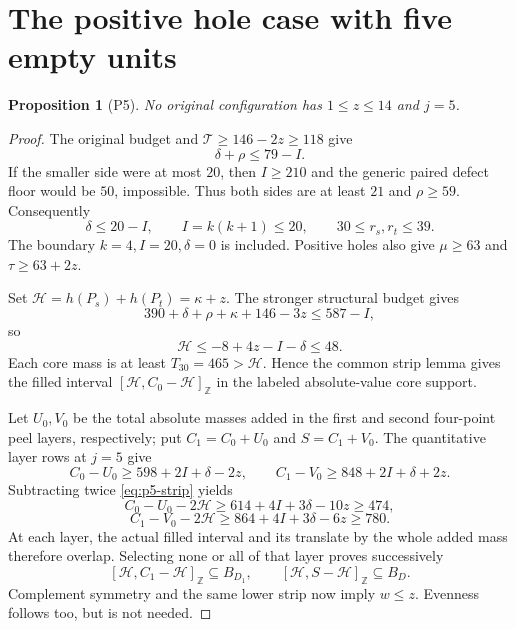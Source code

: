 \documentclass[11pt,letterpaper]{article}
\newcommand{\Z}{\mathbb Z}\newcommand{\R}{\mathbb R}
\newtheorem{proposition}[theorem]{Proposition}
\theoremstyle{definition}\newtheorem{definition}[theorem]{Definition}
\begin{document}
\section{The positive hole case with five empty units}\label{sec:p5}
\begin{proposition}[P5]\label{prop:p5}
No original configuration has $1\le z\le14$ and $j=5$.
\end{proposition}
\begin{proof}
The original budget and $\mathcal T\ge146-2z\ge118$ give
\[
\delta+\rho\le79-I.
\]
If the smaller side were at most $20$, then $I\ge210$ and the generic paired defect floor would be $50$, impossible. Thus both sides are at least $21$ and $\rho\ge59$. Consequently
\begin{equation}\label{eq:p5-domain}
\delta\le20-I,\qquad I=k(k+1)\le20,\qquad30\le r_s,r_t\le39.
\end{equation}
The boundary $k=4,I=20,\delta=0$ is included. Positive holes also give $\mu\ge63$ and $\tau\ge63+2z$.

Set $\mathcal H=h(P_s)+h(P_t)=\kappa+z$. The stronger structural budget gives
\[
390+\delta+\rho+\kappa+146-3z\le587-I,
\]
so
\begin{equation}\label{eq:p5-strip}
\mathcal H\le-8+4z-I-\delta\le48.
\end{equation}
Each core mass is at least $T_{30}=465>\mathcal H$. Hence the common strip lemma gives the filled interval $[\mathcal H,C_0-\mathcal H]_{\Z}$ in the labeled absolute-value core support.

Let $U_0,V_0$ be the total absolute masses added in the first and second four-point peel layers, respectively; put $C_1=C_0+U_0$ and $S=C_1+V_0$. The quantitative layer rows at $j=5$ give
\[
C_0-U_0\ge598+2I+\delta-2z,
\qquad C_1-V_0\ge848+2I+\delta+2z.
\]
Subtracting twice \eqref{eq:p5-strip} yields
\[
C_0-U_0-2\mathcal H\ge614+4I+3\delta-10z\ge474,
\]
\[
C_1-V_0-2\mathcal H\ge864+4I+3\delta-6z\ge780.
\]
At each layer, the actual filled interval and its translate by the whole added mass therefore overlap. Selecting none or all of that layer proves successively
\[
[\mathcal H,C_1-\mathcal H]_{\Z}\subseteq B_{D_1},\qquad
[\mathcal H,S-\mathcal H]_{\Z}\subseteq B_D.
\]
Complement symmetry and the same lower strip now imply $w\le z$. Evenness follows too, but is not needed.


\end{proof}
\end{document}
